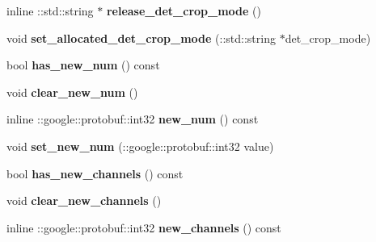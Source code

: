\begin{DoxyCompactItemize}
\item 
\mbox{\label{classcaffe_1_1_v0_layer_parameter_ad8c976db58c50b209f262fdf132300c4}} 
inline \+::std\+::string $\ast$ {\bfseries release\+\_\+det\+\_\+crop\+\_\+mode} ()
\item 
\mbox{\label{classcaffe_1_1_v0_layer_parameter_ae6e1371aa7df8e8d4ac3899e874c1f1a}} 
void {\bfseries set\+\_\+allocated\+\_\+det\+\_\+crop\+\_\+mode} (\+::std\+::string $\ast$det\+\_\+crop\+\_\+mode)
\item 
\mbox{\label{classcaffe_1_1_v0_layer_parameter_a138b6408702d2df36086d314f97023f8}} 
bool {\bfseries has\+\_\+new\+\_\+num} () const
\item 
\mbox{\label{classcaffe_1_1_v0_layer_parameter_af108c4334e5cbfdafcf84bf0795dea29}} 
void {\bfseries clear\+\_\+new\+\_\+num} ()
\item 
\mbox{\label{classcaffe_1_1_v0_layer_parameter_ac9155970e43938142e84de689392ceeb}} 
inline \+::google\+::protobuf\+::int32 {\bfseries new\+\_\+num} () const
\item 
\mbox{\label{classcaffe_1_1_v0_layer_parameter_aaa138be72aaf0686f7b4b63d6c2ba1be}} 
void {\bfseries set\+\_\+new\+\_\+num} (\+::google\+::protobuf\+::int32 value)
\item 
\mbox{\label{classcaffe_1_1_v0_layer_parameter_a90e319602d23542ec0f37f12184c70f8}} 
bool {\bfseries has\+\_\+new\+\_\+channels} () const
\item 
\mbox{\label{classcaffe_1_1_v0_layer_parameter_a6396319ce6b06b8219a15ef3edba1163}} 
void {\bfseries clear\+\_\+new\+\_\+channels} ()
\item 
\mbox{\label{classcaffe_1_1_v0_layer_parameter_ad943dd1d5927c8dffd727cf57af25352}} 
inline \+::google\+::protobuf\+::int32 {\bfseries new\+\_\+channels} () const
\item 
\mbox{\label{classcaffe_1_1_v0_layer_parameter_a9e942e6312390b2b5ba370325f776b20}} 

\end{DoxyCompactItemize}
